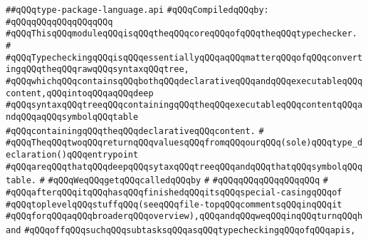 \label{src/lib/compiler/front/typer/main/type-package-language.api}
\verb|##qQQqtype-package-language.api|\newline
\newline
\verb|#qQQqCompiledqQQqby:|\newline
\verb|#qQQqqQQqqQQqqQQqqQQq|\newline
\newline
\verb|#qQQqThisqQQqmoduleqQQqisqQQqtheqQQqcoreqQQqofqQQqtheqQQqtypechecker.|\newline
\verb|#|\newline
\verb|#qQQqTypecheckingqQQqisqQQqessentiallyqQQqaqQQqmatterqQQqofqQQqconvertingqQQqtheqQQqrawqQQqsyntaxqQQqtree,|\newline
\verb|#qQQqwhichqQQqcontainsqQQqbothqQQqdeclarativeqQQqandqQQqexecutableqQQqcontent,qQQqintoqQQqaqQQqdeep|\newline
\verb|#qQQqsyntaxqQQqtreeqQQqcontainingqQQqtheqQQqexecutableqQQqcontentqQQqandqQQqaqQQqsymbolqQQqtable|\newline
\verb|#qQQqcontainingqQQqtheqQQqdeclarativeqQQqcontent.|\newline
\verb|#|\newline
\verb|#qQQqTheqQQqtwoqQQqreturnqQQqvaluesqQQqfromqQQqourqQQq(sole)qQQqtype_declaration()qQQqentrypoint|\newline
\verb|#qQQqareqQQqthatqQQqdeepqQQqsytaxqQQqtreeqQQqandqQQqthatqQQqsymbolqQQqtable.|\newline
\verb|#|\newline
\verb|#qQQqWeqQQqgetqQQqcalledqQQqby|\newline
\verb|#|\newline
\verb|#qQQqqQQqqQQqqQQqqQQq|\newline
\verb|#|\newline
\verb|#qQQqafterqQQqitqQQqhasqQQqfinishedqQQqitsqQQqspecial-casingqQQqof|\newline
\verb|#qQQqtoplevelqQQqstuffqQQq(seeqQQqfile-topqQQqcommentsqQQqinqQQqit|\newline
\verb|#qQQqforqQQqaqQQqbroaderqQQqoverview),qQQqandqQQqweqQQqinqQQqturnqQQqhand|\newline
\verb|#qQQqoffqQQqsuchqQQqsubtasksqQQqasqQQqtypecheckingqQQqofqQQqapis,|\newline
